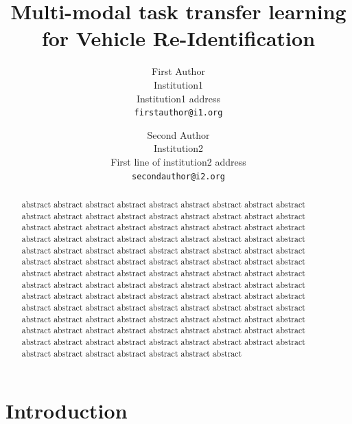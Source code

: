 \documentclass[10pt,twocolumn,letterpaper]{article}
\begin{document}
\title{Multi-modal task transfer learning for Vehicle Re-Identification}

\author{First Author\\
Institution1\\
Institution1 address\\
{\tt\small firstauthor@i1.org}
\and
Second Author\\
Institution2\\
First line of institution2 address\\
{\tt\small secondauthor@i2.org}
}

\maketitle

\begin{abstract}
  abstract  abstract  abstract  abstract  abstract  abstract  abstract  abstract  abstract  abstract  abstract  abstract  abstract  abstract  abstract  abstract  abstract  abstract  abstract  abstract  abstract  abstract  abstract  abstract  abstract  abstract  abstract  abstract  abstract  abstract  abstract  abstract  abstract  abstract  abstract  abstract  abstract  abstract  abstract  abstract  abstract  abstract  abstract  abstract  abstract  abstract  abstract  abstract  abstract  abstract  abstract  abstract  abstract  abstract  abstract  abstract  abstract  abstract  abstract  abstract  abstract  abstract  abstract  abstract  abstract  abstract  abstract  abstract  abstract  abstract  abstract  abstract  abstract  abstract  abstract  abstract  abstract  abstract  abstract  abstract  abstract  abstract  abstract  abstract  abstract  abstract  abstract  abstract  abstract  abstract  abstract  abstract  abstract  abstract  abstract  abstract  abstract  abstract  abstract  abstract  abstract  abstract  abstract  abstract  abstract  abstract  abstract  abstract  abstract  abstract  abstract  abstract  abstract  abstract  abstract  abstract  abstract  abstract  abstract  abstract  abstract  abstract  abstract  abstract
\end{abstract}

\section{Introduction}
\end{document}
